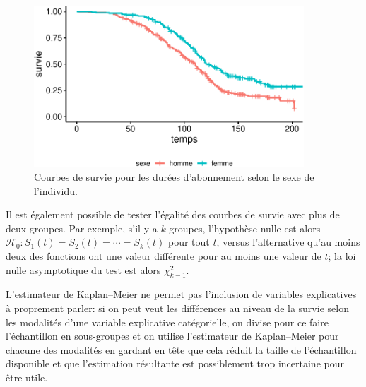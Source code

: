 \documentclass[
  11pt,
  letterpaper,
]{book}
\theoremstyle{definition}
\theoremstyle{remark}
\begin{document}
\begin{figure}[ht!]

{\centering \includegraphics[width=0.9\textwidth,height=\textheight]{./06-survie_files/figure-pdf/fig-survie-comparaison-courbes-1.pdf}

}

\caption{\label{fig-survie-comparaison-courbes}Courbes de survie pour
les durées d'abonnement selon le sexe de l'individu.}

\end{figure}

Il est également possible de tester l'égalité des courbes de survie avec
plus de deux groupes. Par exemple, s'il y a \(k\) groupes, l'hypothèse
nulle est alors \(\mathscr{H}_0: S_1(t)=S_2(t)=\cdots = S_k(t)\) pour
tout \(t\), versus l'alternative qu'au moins deux des fonctions ont une
valeur différente pour au moins une valeur de \(t\); la loi nulle
asymptotique du test est alors \(\chi^2_{k-1}\).

L'estimateur de Kaplan--Meier ne permet pas l'inclusion de variables
explicatives à proprement parler: si on peut veut les différences au
niveau de la survie selon les modalités d'une variable explicative
catégorielle, on divise pour ce faire l'échantillon en sous-groupes et
on utilise l'estimateur de Kaplan--Meier pour chacune des modalités en
gardant en tête que cela réduit la taille de l'échantillon disponible et
que l'estimation résultante est possiblement trop incertaine pour être
utile.
\end{document}
